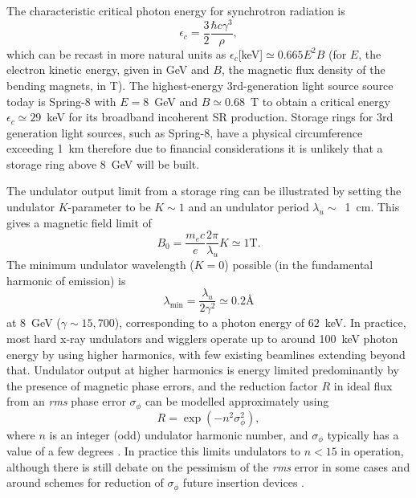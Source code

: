 \documentclass[../main.tex]{subfiles}
\begin{document}
The characteristic critical photon energy for synchrotron radiation is
\begin{equation}
\epsilon_{c}=\frac{3}{2}\frac{\hbar c \gamma^3}{\rho},
\label{eq:synchrotron_critical_energy}
\end{equation}
which can be recast in more natural units as $\epsilon_{c}$[\si{\kilo\electronvolt}]$\simeq 0.665E^{2}B$ (for $E$, the electron kinetic energy, given in \si{\giga\electronvolt} and $B$, the magnetic flux density of the bending magnets, in \si{\tesla}). The highest-energy 3rd-generation light source source today is Spring-8 with $E = 8$~\si{\giga\electronvolt} and $B\simeq 0.68$~\si{\tesla} to obtain a critical energy $\epsilon_{c}\simeq 29$~\si{\kilo\electronvolt} for its broadband incoherent SR production. Storage rings for 3rd generation light sources, such as Spring-8, have a physical circumference exceeding 1~\si{\kilo\meter} therefore due to financial considerations it is unlikely that a storage ring above 8~\si{\giga\electronvolt} will be built. 

The undulator output limit from a storage ring can be illustrated by setting the undulator $K$-parameter to be $K \sim 1$ and an undulator period $\lambda_u \sim$~1~\si{\centi\meter}. This gives a magnetic field limit of
\begin{equation}
B_0 = \frac{m_{e} c}{e}\frac{2\pi}{\lambda_{u}} K \simeq 1\textrm{T}.
\label{eq:undulator_field_limit}
\end{equation}
The minimum undulator wavelength ($K=0$) possible (in the fundamental harmonic of emission) is
\begin{equation}
\lambda_\textrm{min} = \frac{\lambda_{u}}{2 \gamma^2} \simeq 0.2 \textrm{\AA}
\label{eq:undulator_minimum_wavelength}
\end{equation}
at 8~\si{\giga\electronvolt} ($\gamma \sim 15,700$), corresponding to a photon energy of $62$~\si{\kilo\electronvolt}. In practice, most hard x-ray undulators and wigglers operate up to around 100~\si{\kilo\electronvolt} photon energy by using higher harmonics, with few existing beamlines extending beyond that. Undulator output at higher harmonics is energy limited predominantly by the presence of magnetic phase errors, and the reduction factor $R$ in ideal flux from an \textit{rms} phase error $\sigma_{\phi}$ can be modelled approximately \cite{walker1993interference} using 
\begin{equation}
R=\exp{\left(-n^2 \sigma_{\phi}^{2}\right)},
\label{eq:undulator_phase_errors}
\end{equation}
where $n$ is an integer (odd) undulator harmonic number, and $\sigma_\phi$ typically has a value of a few degrees \cite{walker2013phase}. In practice this limits undulators to $n<15$ in operation, although there is still debate on the pessimism of the \textit{rms} error in some cases \cite{tanaka2018universal} and around schemes for reduction of $\sigma_{\phi}$ future insertion devices \cite{hwang2011development,huang2017challenges}.
\end{document}
